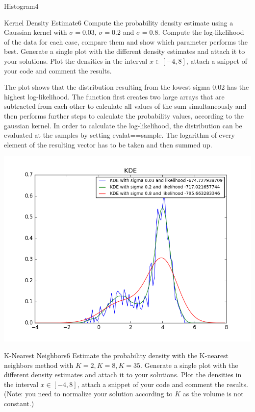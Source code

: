 \begin{questions}
\begin{question}{Histogram}{4}
\end{question}


\begin{question}{Kernel Density Estimate}{6}
Compute the probability density estimate using a Gaussian kernel with $\sigma=0.03$, $\sigma=0.2$ and $\sigma=0.8$. Compute the log-likelihood of the data for each case, compare them and show which parameter performs the best.
Generate a single plot with the different density estimates and attach it to your solutions. Plot the densities in the interval $x \in [-4,8]$, attach a snippet of your code and comment the results.

\begin{answer}
	The plot shows that the distribution resulting from the lowest sigma 0.02 has the highest log-likelihood. The function first creates two large arrays that are subtracted from each other to calculate all values of the sum simultaneously and then performs further steps to calculate the probability values, according to the gaussian kernel. In order to calculate the log-likelihood, the distribution can be evaluated at the samples by setting evalat==sample. The logarithm of every element of the resulting vector has to be taken and then summed up.
	
	\centering \includegraphics[width=0.6\linewidth]{dataSets/2-3-b}\label{fig:kde}

	
	
\end{answer}

\end{question}


\begin{question}{K-Nearest Neighbors}{6}
Estimate the probability density with the K-nearest neighbors method with $K=2, K=8, K=35$.
Generate a single plot with the different density estimates and attach it to your solutions. Plot the densities in the interval $x \in [-4,8]$, attach a snippet of your code and comment the results.
(Note: you need to normalize your solution according to $K$ as the volume is not constant.)



\end{question}
\end{questions}

